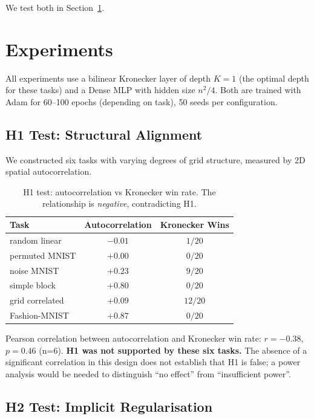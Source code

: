 \documentclass[11pt,a4paper]{article}
\begin{document}
We test both in Section~\ref{sec:experiments}.


\section{Experiments}
\label{sec:experiments}

All experiments use a bilinear Kronecker layer of depth $K=1$
(the optimal depth for these tasks) and a Dense MLP with hidden
size $n^2/4$. Both are trained with Adam for 60--100 epochs
(depending on task), 50 seeds per configuration.

\subsection{H1 Test: Structural Alignment}
\label{sec:h1}

We constructed six tasks with varying degrees of grid structure,
measured by 2D spatial autocorrelation.

\begin{table}[h]
\centering
\caption{H1 test: autocorrelation vs Kronecker win rate. The
relationship is \emph{negative}, contradicting H1.}
\label{tab:h1}
\small
\begin{tabular}{lcc}
\toprule
Task & Autocorrelation & Kronecker Wins \\
\midrule
random linear     & $-0.01$ & $1/20$ \\
permuted MNIST    & $+0.00$ & $0/20$ \\
noise MNIST       & $+0.23$ & $9/20$ \\
simple block      & $+0.80$ & $0/20$ \\
grid correlated   & $+0.09$ & $12/20$ \\
Fashion-MNIST     & $+0.87$ & $0/20$ \\
\bottomrule
\end{tabular}
\end{table}

Pearson correlation between autocorrelation and Kronecker win rate:
$r = -0.38$, $p = 0.46$ (n=6). \textbf{H1 was not supported by these six tasks.} The absence of a significant correlation in this design does not establish that H1 is false; a power analysis would be needed to distinguish ``no effect'' from ``insufficient power''.


\subsection{H2 Test: Implicit Regularisation}
\label{sec:h2}
\end{document}
